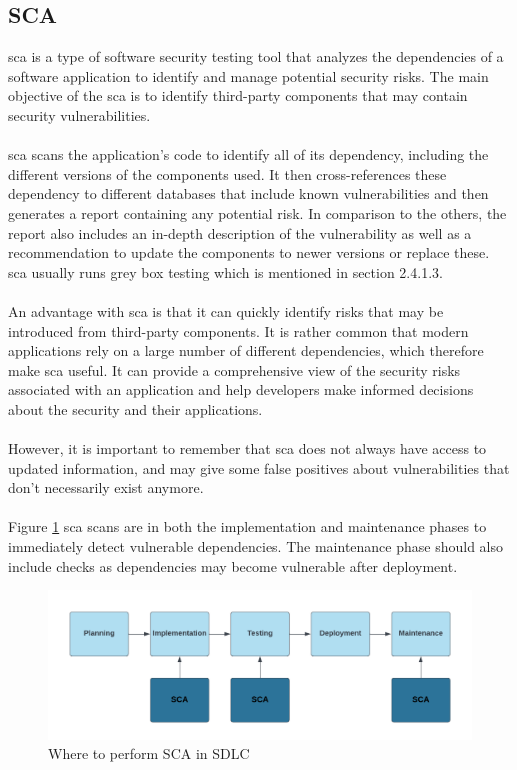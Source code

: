 \subsection{SCA}
\acrlong{sca} is a type of software security testing tool that analyzes the dependencies of a software application to identify and manage potential security risks. The main objective of the \acrshort{sca} is to identify third-party components that may contain security vulnerabilities. \cite{sca}
\\~\\
\acrshort{sca} scans the application's code to identify all of its \gls{dependency}, including the different versions of the components used. It then cross-references these \gls{dependency} to different databases that include known vulnerabilities and then generates a report containing any potential risk. In comparison to the others, the report also includes an in-depth description of the vulnerability as well as a recommendation to update the components to newer versions or replace these. \acrshort{sca} usually runs grey box testing which is mentioned in section 2.4.1.3. 
\\~\\
An advantage with \acrshort{sca} is that it can quickly identify risks that may be introduced from third-party components. It is rather common that modern applications rely on a large number of different dependencies, which therefore make \acrshort{sca} useful. It can provide a comprehensive view of the security risks associated with an application and help developers make informed decisions about the security and their applications. 
\\~\\
However, it is important to remember that \acrshort{sca} does not always have access to updated information, and may give some false positives 
about vulnerabilities that don't necessarily exist anymore. 
\\~\\
Figure \ref{fig: Where to perform SCA in SDLC} \acrshort{sca} scans are in both the implementation and maintenance phases to immediately detect vulnerable dependencies. The maintenance phase should also include checks as dependencies may become vulnerable after deployment.
\vspace{2mm}
\begin{figure}[H]
    \centering
    \includegraphics[width=0.8\columnwidth]{Images/sca.png}
    \caption{Where to perform SCA in SDLC} 
    \label{fig: Where to perform SCA in SDLC}
\end{figure}

